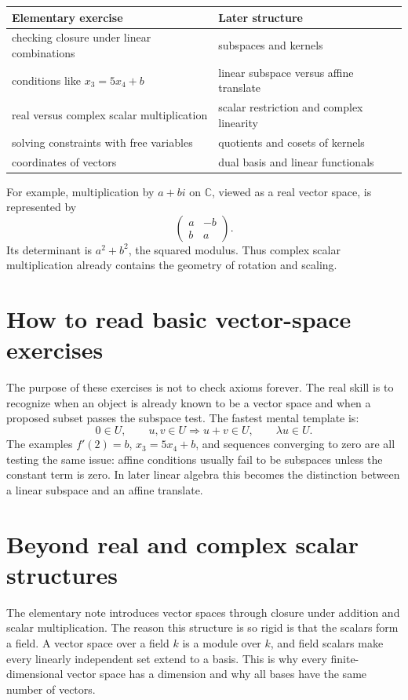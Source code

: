 \begin{center}
\small
\begin{tabularx}{\textwidth}{@{}lY@{}}
\toprule
Elementary exercise & Later structure\\
\midrule
checking closure under linear combinations & subspaces and kernels\\
conditions like \(x_3=5x_4+b\) & linear subspace versus affine translate\\
real versus complex scalar multiplication & scalar restriction and complex linearity\\
solving constraints with free variables & quotients and cosets of kernels\\
coordinates of vectors & dual basis and linear functionals\\
\bottomrule
\end{tabularx}
\end{center}

For example, multiplication by \(a+bi\) on \(\mathbb C\), viewed as a real vector space, is represented by
\[
  \begin{pmatrix}a&-b\\ b&a\end{pmatrix}.
\]
Its determinant is \(a^2+b^2\), the squared modulus.  Thus complex scalar multiplication already contains the geometry of rotation and scaling.
\section{How to read basic vector-space exercises}

The purpose of these exercises is not to check axioms forever.  The real skill is to recognize when an object is already known to be a vector space and when a proposed subset passes the subspace test.  The fastest mental template is:
\[
  0\in U,\qquad u,v\in U\Rightarrow u+v\in U,\qquad \lambda u\in U.
\]
The examples \(f'(2)=b\), \(x_3=5x_4+b\), and sequences converging to zero are all testing the same issue: affine conditions usually fail to be subspaces unless the constant term is zero.  In later linear algebra this becomes the distinction between a linear subspace and an affine translate.

\section{Beyond real and complex scalar structures}

The elementary note introduces vector spaces through closure under addition and scalar multiplication.  The reason this structure is so rigid is that the scalars form a field.  A vector space over a field $k$ is a module over $k$, and field scalars make every linearly independent set extend to a basis.  This is why every finite-dimensional vector space has a dimension and why all bases have the same number of vectors.

